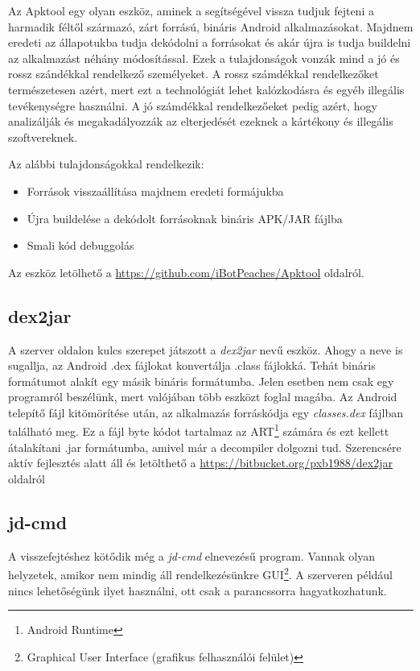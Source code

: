 \documentclass{thesis-ekf}
\theoremstyle{definition}
\theoremstyle{remark}
\begin{document}
Az Apktool egy olyan eszköz, aminek a segítségével vissza tudjuk fejteni a harmadik féltől származó, zárt forrású, bináris Android alkalmazásokat.
Majdnem eredeti az állapotukba tudja dekódolni a forrásokat és akár újra is tudja buildelni az alkalmazást néhány módosítással.
Ezek a tulajdonságok vonzák mind a jó és rossz szándékkal rendelkező személyeket.
A rossz számdékkal rendelkezőket természetesen azért, mert ezt a technológiát lehet kalózkodásra és egyéb illegális tevékenységre használni.
A jó számdékkal rendelkezőeket pedig azért, hogy analizálják és megakadályozzák az elterjedését ezeknek a kártékony és illegális szoftvereknek.

Az alábbi tulajdonságokkal rendelkezik:

\begin{itemize}
	\item Források visszaállítása majdnem eredeti formájukba
	\item Újra buildelése a dekódolt forrásoknak bináris APK/JAR fájlba
	\item Smali kód debuggolás
\end{itemize}

Az eszköz letölhető a \url{https://github.com/iBotPeaches/Apktool} oldalról.

\subsection{dex2jar}

A  szerver oldalon kulcs szerepet játszott a \emph{dex2jar} nevű eszköz.
Ahogy a neve is sugallja, az Android .dex fájlokat konvertálja .class fájlokká.
Tehát bináris formátumot alakít egy másik bináris formátumba.
Jelen esetben nem csak egy programról beszélünk, mert valójában több eszközt foglal magába.
Az Android telepítő fájl kitömörítése után, az alkalmazás forráskódja egy \emph{classes.dex} fájlban található meg.
Ez a fájl byte kódot tartalmaz az ART\footnote{Android Runtime} számára és ezt kellett átalakítani .jar formátumba, amivel már a decompiler dolgozni tud.
Szerencsére aktív fejlesztés alatt áll és letölthető a \url{https://bitbucket.org/pxb1988/dex2jar} oldalról

\subsection{jd-cmd}

A visszefejtéshez kötődik még a \emph{jd-cmd} elnevezésű program.
Vannak olyan helyzetek, amikor nem mindig áll rendelkezésünkre GUI\footnote{Graphical User Interface (grafikus felhasználói felület)}.
A szerveren például nincs lehetőségünk ilyet használni, ott csak a parancssorra hagyatkozhatunk.
\end{document}
